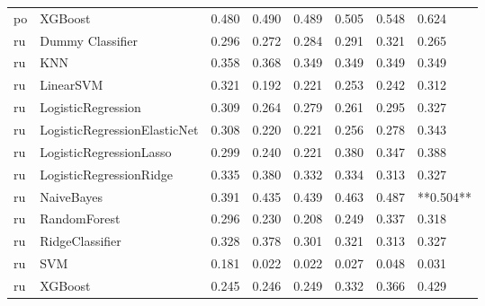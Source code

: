 \begin{tabular}{llllllll}
      po &                      XGBoost & 0.480 &                     0.490 &                 0.489 &                  0.505 &                                   0.548 &     0.624 \\
      ru &             Dummy Classifier & 0.296 &                     0.272 &                 0.284 &                  0.291 &                                   0.321 &     0.265 \\
      ru &                          KNN & 0.358 &                     0.368 &                 0.349 &                  0.349 &                                   0.349 &     0.349 \\
      ru &                    LinearSVM & 0.321 &                     0.192 &                 0.221 &                  0.253 &                                   0.242 &     0.312 \\
      ru &           LogisticRegression & 0.309 &                     0.264 &                 0.279 &                  0.261 &                                   0.295 &     0.327 \\
      ru & LogisticRegressionElasticNet & 0.308 &                     0.220 &                 0.221 &                  0.256 &                                   0.278 &     0.343 \\
      ru &      LogisticRegressionLasso & 0.299 &                     0.240 &                 0.221 &                  0.380 &                                   0.347 &     0.388 \\
      ru &      LogisticRegressionRidge & 0.335 &                     0.380 &                 0.332 &                  0.334 &                                   0.313 &     0.327 \\
      ru &                   NaiveBayes & 0.391 &                     0.435 &                 0.439 &                  0.463 &                                   0.487 & **0.504** \\
      ru &                 RandomForest & 0.296 &                     0.230 &                 0.208 &                  0.249 &                                   0.337 &     0.318 \\
      ru &              RidgeClassifier & 0.328 &                     0.378 &                 0.301 &                  0.321 &                                   0.313 &     0.327 \\
      ru &                          SVM & 0.181 &                     0.022 &                 0.022 &                  0.027 &                                   0.048 &     0.031 \\
      ru &                      XGBoost & 0.245 &                     0.246 &                 0.249 &                  0.332 &                                   0.366 &     0.429 \\
\bottomrule
\end{tabular}
